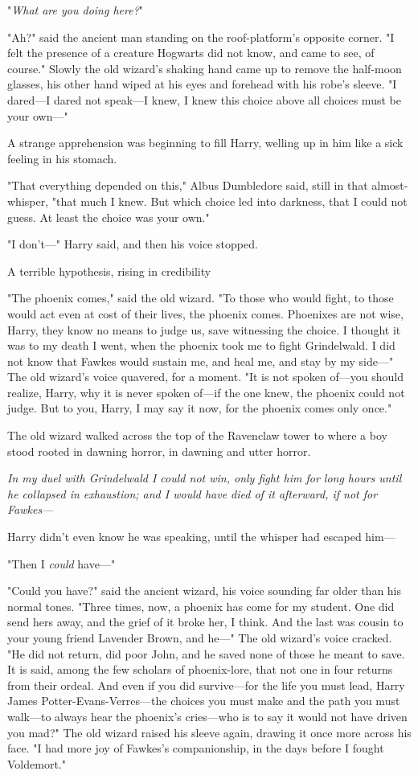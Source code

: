 "\emph{What are you doing here?}"

"Ah?" said the ancient man standing on the roof-platform's opposite corner. "I
felt the presence of a creature Hogwarts did not know, and came to see, of
course." Slowly the old wizard's shaking hand came up to remove the half-moon
glasses, his other hand wiped at his eyes and forehead with his robe's sleeve.
"I dared—I dared not speak—I knew, I knew this choice above all choices
must be your own—"

A strange apprehension was beginning to fill Harry, welling up in him like a
sick feeling in his stomach.

"That everything depended on this," Albus Dumbledore said, still in that
almost-whisper, "that much I knew. But which choice led into darkness, that I
could not guess. At least the choice was your own."

"I don't—" Harry said, and then his voice stopped.

A terrible hypothesis, rising in credibility{\el}

"The phoenix comes," said the old wizard. "To those who would fight, to those
would act even at cost of their lives, the phoenix comes. Phoenixes are not
wise, Harry, they know no means to judge us, save witnessing the choice. I
thought it was to my death I went, when the phoenix took me to fight
Grindelwald. I did not know that Fawkes would sustain me, and heal me, and stay
by my side—" The old wizard's voice quavered, for a moment. "It is not spoken
of—you should realize, Harry, why it is never spoken of—if the one knew,
the phoenix could not judge. But to you, Harry, I may say it now, for the
phoenix comes only once."

The old wizard walked across the top of the Ravenclaw tower to where a boy
stood rooted in dawning horror, in dawning and utter horror.

\emph{In my duel with Grindelwald I could not win, only fight him for long
hours until he collapsed in exhaustion; and I would have died of it afterward,
if not for Fawkes—}

Harry didn't even know he was speaking, until the whisper had escaped him—

"Then I \emph{could} have—"

"Could you have?" said the ancient wizard, his voice sounding far older than
his normal tones. "Three times, now, a phoenix has come for my student. One did
send hers away, and the grief of it broke her, I think. And the last was cousin
to your young friend Lavender Brown, and he—" The old wizard's voice cracked.
"He did not return, did poor John, and he saved none of those he meant to save.
It is said, among the few scholars of phoenix-lore, that not one in four
returns from their ordeal. And even if you did survive—for the life you must
lead, Harry James Potter-Evans-Verres—the choices you must make and the path
you must walk—to always hear the phoenix's cries—who is to say it would not
have driven you mad?" The old wizard raised his sleeve again, drawing it once
more across his face. "I had more joy of Fawkes's companionship, in the days
before I fought Voldemort."

